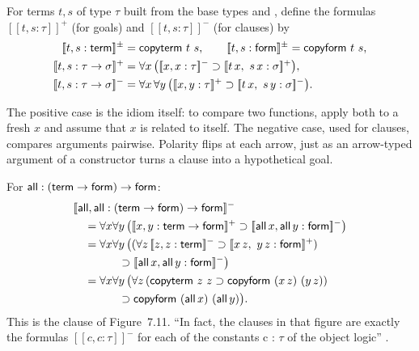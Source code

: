 {{{{{{\begin{definition}\label{def:lambdatree-lowering}
For terms $t,s$ of type $\tau$ built from the base types  and , define the formulas
$[\![t,s:\tau]\!]^{+}$ (for goals) and $[\![t,s:\tau]\!]^{-}$ (for clauses) by
\[
\begin{aligned}
{}[\![t,s:\cst{term}]\!]^{\pm} &= \cst{copyterm}\ t\ s, \qquad
[\![t,s:\cst{form}]\!]^{\pm} = \cst{copyform}\ t\ s,\\
[\![t,s:\tau\to\sigma]\!]^{+} &= \forall x\,\big([\![x,x:\tau]\!]^{-}\imp[\![t\,x,\ s\,x:\sigma]\!]^{+}\big),\\
[\![t,s:\tau\to\sigma]\!]^{-} &= \forall x\,\forall y\,\big([\![x,y:\tau]\!]^{+}\imp[\![t\,x,\ s\,y:\sigma]\!]^{-}\big).
\end{aligned}
\]
\end{definition}
The positive case is the idiom itself: to compare two functions, apply both to a fresh $x$ and assume that $x$
is related to itself. The negative case, used for clauses, compares arguments pairwise. Polarity flips at each
arrow, just as an arrow-typed argument of a constructor turns a clause into a hypothetical goal.

\begin{example}\label{ex:lambdatree-lower-all}
For $\mathsf{all}:(\mathsf{term}\to\mathsf{form})\to\mathsf{form}$:
\[
\begin{aligned}
&[\![\cst{all},\cst{all}:(\cst{term}\to\cst{form})\to\cst{form}]\!]^{-}\\
&\quad= \forall x\forall y\,\big([\![x,y:\cst{term}\to\cst{form}]\!]^{+}\imp[\![\cst{all}\,x,\cst{all}\,y:\cst{form}]\!]^{-}\big)\\
&\quad= \forall x\forall y\,\big((\forall z\,[\![z,z:\cst{term}]\!]^{-}\imp[\![x\,z,\ y\,z:\cst{form}]\!]^{+})\\
&\qquad\qquad\imp[\![\cst{all}\,x,\cst{all}\,y:\cst{form}]\!]^{-}\big)\\
&\quad= \forall x\forall y\,\big(\forall z\,(\cst{copyterm}\ z\ z\imp\cst{copyform}\ (x\,z)\ (y\,z))\\
&\qquad\qquad\imp\cst{copyform}\ (\cst{all}\,x)\ (\cst{all}\,y)\big).
\end{aligned}
\]
This is the  clause of Figure~7.11. \enquote{In fact, the clauses in that figure are exactly the formulas
$[\![c, c : \tau]\!]^-$ for each of the constants c : $\tau$ of the object logic} .
\end{example}

}}}}}}

